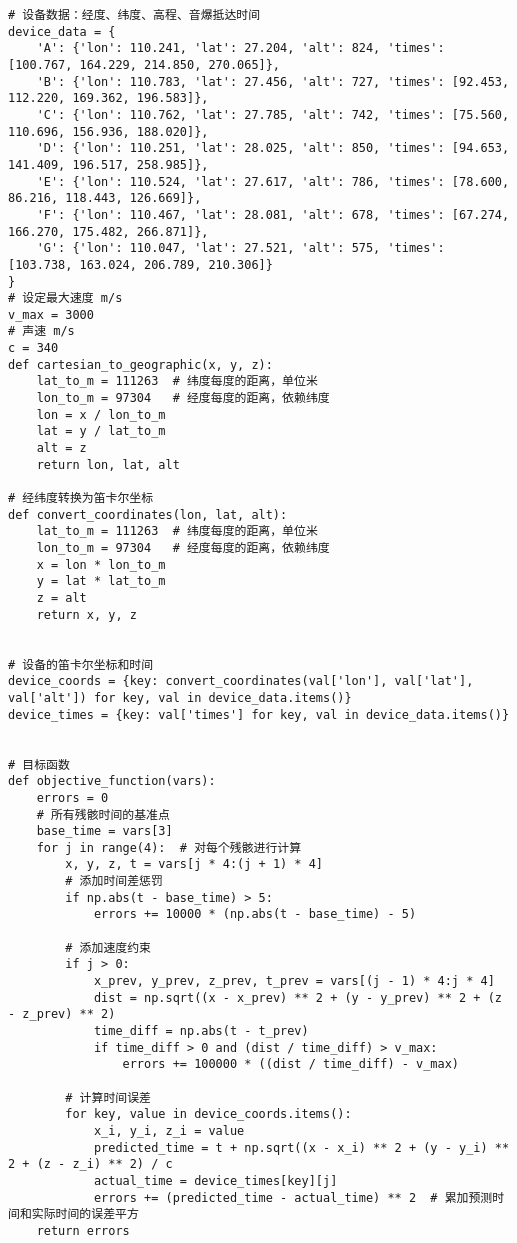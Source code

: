 \documentclass[withoutpreface,bwprint,12pt,a4paper]{cumcmthesis}
\begin{document}
\begin{appendices}
\begin{lstlisting}
# 设备数据：经度、纬度、高程、音爆抵达时间
device_data = {
    'A': {'lon': 110.241, 'lat': 27.204, 'alt': 824, 'times': [100.767, 164.229, 214.850, 270.065]},
    'B': {'lon': 110.783, 'lat': 27.456, 'alt': 727, 'times': [92.453, 112.220, 169.362, 196.583]},
    'C': {'lon': 110.762, 'lat': 27.785, 'alt': 742, 'times': [75.560, 110.696, 156.936, 188.020]},
    'D': {'lon': 110.251, 'lat': 28.025, 'alt': 850, 'times': [94.653, 141.409, 196.517, 258.985]},
    'E': {'lon': 110.524, 'lat': 27.617, 'alt': 786, 'times': [78.600, 86.216, 118.443, 126.669]},
    'F': {'lon': 110.467, 'lat': 28.081, 'alt': 678, 'times': [67.274, 166.270, 175.482, 266.871]},
    'G': {'lon': 110.047, 'lat': 27.521, 'alt': 575, 'times': [103.738, 163.024, 206.789, 210.306]}
}
# 设定最大速度 m/s
v_max = 3000
# 声速 m/s
c = 340
def cartesian_to_geographic(x, y, z):
    lat_to_m = 111263  # 纬度每度的距离，单位米
    lon_to_m = 97304   # 经度每度的距离，依赖纬度
    lon = x / lon_to_m
    lat = y / lat_to_m
    alt = z
    return lon, lat, alt

# 经纬度转换为笛卡尔坐标
def convert_coordinates(lon, lat, alt):
    lat_to_m = 111263  # 纬度每度的距离，单位米
    lon_to_m = 97304   # 经度每度的距离，依赖纬度
    x = lon * lon_to_m
    y = lat * lat_to_m
    z = alt
    return x, y, z


# 设备的笛卡尔坐标和时间
device_coords = {key: convert_coordinates(val['lon'], val['lat'], val['alt']) for key, val in device_data.items()}
device_times = {key: val['times'] for key, val in device_data.items()}


# 目标函数
def objective_function(vars):
    errors = 0
    # 所有残骸时间的基准点
    base_time = vars[3]
    for j in range(4):  # 对每个残骸进行计算
        x, y, z, t = vars[j * 4:(j + 1) * 4]
        # 添加时间差惩罚
        if np.abs(t - base_time) > 5:
            errors += 10000 * (np.abs(t - base_time) - 5)

        # 添加速度约束
        if j > 0:
            x_prev, y_prev, z_prev, t_prev = vars[(j - 1) * 4:j * 4]
            dist = np.sqrt((x - x_prev) ** 2 + (y - y_prev) ** 2 + (z - z_prev) ** 2)
            time_diff = np.abs(t - t_prev)
            if time_diff > 0 and (dist / time_diff) > v_max:
                errors += 100000 * ((dist / time_diff) - v_max)

        # 计算时间误差
        for key, value in device_coords.items():
            x_i, y_i, z_i = value
            predicted_time = t + np.sqrt((x - x_i) ** 2 + (y - y_i) ** 2 + (z - z_i) ** 2) / c
            actual_time = device_times[key][j]
            errors += (predicted_time - actual_time) ** 2  # 累加预测时间和实际时间的误差平方
    return errors



\end{lstlisting}
\end{appendices}
\end{document}
